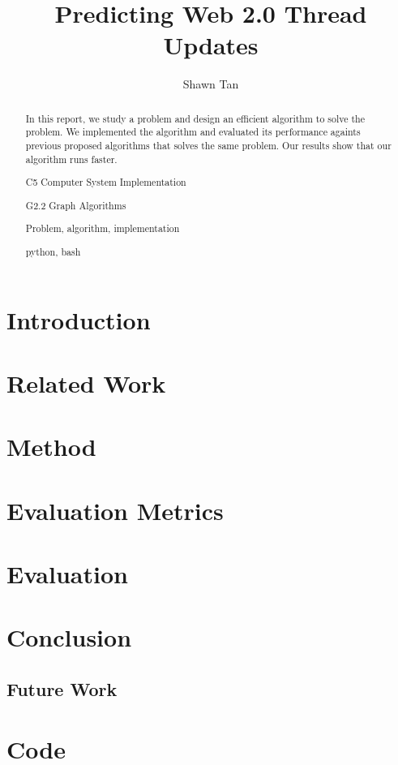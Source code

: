 \documentclass[hyp]{socreport}
\begin{document}
\title{Predicting Web 2.0 Thread Updates}
\author{Shawn Tan}
\maketitle
\begin{abstract}
In this report, we study a problem and design an efficient algorithm
to solve the problem.  We implemented the algorithm and evaluated
its performance againts previous proposed algorithms that solves the
same problem.  Our results show that our algorithm runs faster.

\begin{descriptors}
    \item C5 Computer System Implementation
	\item G2.2 Graph Algorithms
\end{descriptors}
\begin{keywords}
	Problem, algorithm, implementation
\end{keywords}
\begin{implement}
	python, bash
\end{implement}
\end{abstract}

\begin{acknowledgement}
\end{acknowledgement}

\listoffigures 
\listoftables
\tableofcontents 

\chapter{Introduction}
	
\chapter{Related Work}
	
\chapter{Method}
	
\chapter{Evaluation Metrics}
	
\chapter{Evaluation}
	
\chapter{Conclusion}
\section{Future Work}




\appendix
\chapter{Code}
\end{document}
